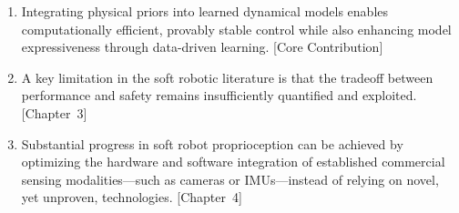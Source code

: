 \documentclass{propositions}
\begin{document}
\begin{enumerate}
    \item %
    Integrating physical priors into learned dynamical models enables computationally efficient, provably stable control while also enhancing model expressiveness through data-driven learning.
    [Core Contribution]
    \item %
    A key limitation in the soft robotic literature is that the tradeoff between performance and safety remains insufficiently quantified and exploited. [Chapter~3]
    \item %
    Substantial progress in soft robot proprioception can be achieved by optimizing the hardware and software integration of established commercial sensing modalities—such as cameras or IMUs—instead of relying on novel, yet unproven, technologies.
    [Chapter~4]

\end{enumerate}
\end{document}
